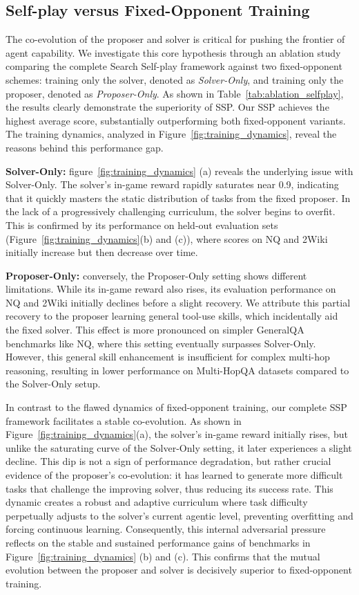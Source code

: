 \documentclass[10pt, a4paper, logo]{googledeepmind} %
\begin{document}
\subsection{Self-play versus Fixed-Opponent Training}
\vspace{-1mm}
The co-evolution of the proposer and solver is critical for pushing the frontier of agent capability. We investigate this core hypothesis through an ablation study comparing the complete Search Self-play framework against two fixed-opponent schemes: training only the solver, denoted as \textit{Solver-Only}, and training only the proposer, denoted as \textit{Proposer-Only}. As shown in Table~\ref{tab:ablation_selfplay}, the results clearly demonstrate the superiority of SSP. Our SSP achieves the highest average score, substantially outperforming both fixed-opponent variants. The training dynamics, analyzed in Figure~\ref{fig:training_dynamics}, reveal the reasons behind this performance gap.

\textbf{Solver-Only:} figure~\ref{fig:training_dynamics} (a) reveals the underlying issue with Solver-Only. The solver's in-game reward rapidly saturates near 0.9, indicating that it quickly masters the static distribution of tasks from the fixed proposer. In the lack of a progressively challenging curriculum, the solver begins to overfit. This is confirmed by its performance on held-out evaluation sets (Figure~\ref{fig:training_dynamics}(b) and (c)), where scores on NQ and 2Wiki initially increase but then decrease over time.

\textbf{Proposer-Only:} conversely, the Proposer-Only setting shows different limitations. While its in-game reward also rises, its evaluation performance on NQ and 2Wiki initially declines before a slight recovery. We attribute this partial recovery to the proposer learning general tool-use skills, which incidentally aid the fixed solver. This effect is more pronounced on simpler GeneralQA benchmarks like NQ, where this setting eventually surpasses Solver-Only. However, this general skill enhancement is insufficient for complex multi-hop reasoning, resulting in lower performance on Multi-HopQA datasets compared to the Solver-Only setup.

In contrast to the flawed dynamics of fixed-opponent training, our complete SSP framework facilitates a stable co-evolution. As shown in Figure~\ref{fig:training_dynamics}(a), the solver's in-game reward initially rises, but unlike the saturating curve of the Solver-Only setting, it later experiences a slight decline. This dip is not a sign of performance degradation, but rather crucial evidence of the proposer's co-evolution: it has learned to generate more difficult tasks that challenge the improving solver, thus reducing its success rate. This dynamic creates a robust and adaptive curriculum where task difficulty perpetually adjusts to the solver's current agentic level, preventing overfitting and forcing continuous learning. Consequently, this internal adversarial pressure reflects on the stable and sustained performance gains of benchmarks in Figure~\ref{fig:training_dynamics} (b) and (c). This confirms that the mutual evolution between the proposer and solver is decisively superior to fixed-opponent training.
\end{document}
